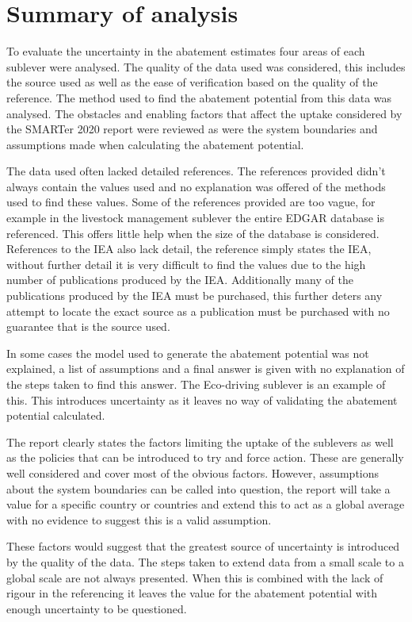 \section{Summary of analysis}

To evaluate the uncertainty in the abatement estimates four areas of each sublever were analysed. The quality of the data used was considered, this includes the source used as well as the ease of verification based on the quality of the reference. The method used to find the abatement potential from this data was analysed. The obstacles and enabling factors that affect the uptake considered by the SMARTer 2020 report were reviewed as were the system boundaries and assumptions made when calculating the abatement potential.

The data used often lacked detailed references. The references provided didn’t always contain the values used and no explanation was offered of the methods used to find these values. Some of the references provided are too vague, for example in the livestock management sublever the entire EDGAR database is referenced. This offers little help when the size of the database is considered. References to the IEA also lack detail, the reference simply states the IEA, without further detail it is very difficult to find the values due to the high number of publications produced by the IEA. Additionally many of the publications produced by the IEA must be purchased, this further deters any attempt to locate the exact source as a publication must be purchased with no guarantee that is the source used.

 In some cases the model used to generate the abatement potential was not explained, a list of assumptions and a final answer is given with no explanation of the steps taken to find this answer. The Eco-driving sublever is an example of this. This introduces uncertainty as it leaves no way of validating the abatement potential calculated. 
 
The report clearly states the factors limiting the uptake of the sublevers as well as the policies that can be introduced to try and force action. These are generally well considered and cover most of the obvious factors. However, assumptions about the system boundaries can be called into question, the report will take a value for a specific country or countries and extend this to act as a global average with no evidence to suggest this is a valid assumption. 

These factors would suggest that the greatest source of uncertainty is introduced by the quality of the data. The steps taken to extend data from a small scale to a global scale are not always presented. When this is combined with the lack of rigour in the referencing it leaves the value for the abatement potential with enough uncertainty to be questioned. 
